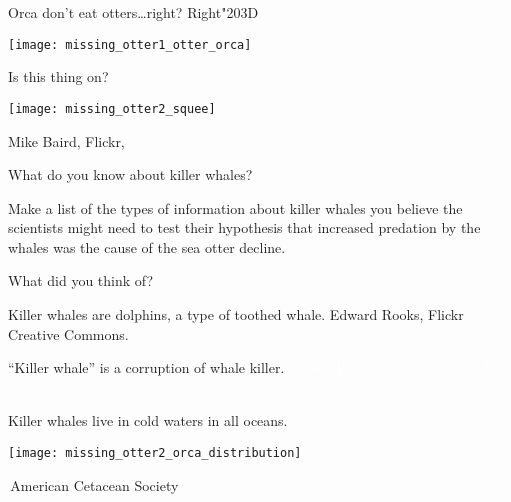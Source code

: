 \documentclass[t]{beamer}
\begin{document}

%
\begin{frame}[t]{Orca don't eat otters\dots right? \hfill Right\char"203D}

	\texttt{[image: missing\_otter1\_otter\_orca]}

	\vfilll
	
	\hfill \tiny Is this thing on?
\end{frame}
%
{
\begin{frame}
\texttt{[image: missing\_otter2\_squee]}

\vfilll

\hfill \tiny Mike Baird, Flickr, 
\end{frame}
}
%
\begin{frame}[t]{What do you know about killer whales?}

	\hangpara Make a list of the types of information about killer whales you believe the scientists might need to test their hypothesis that increased predation by the whales was the cause of the sea otter decline.

	\pause

	\hangpara What did you think of?

\end{frame}
%
{
\begin{frame}[b]{Killer whales are dolphins, a type of toothed whale.}
	\hfill \tiny Edward Rooks, Flickr Creative Commons.
\end{frame}
}
%
{
\begin{frame}[b]{``Killer whale'' is a corruption of whale killer.}
	\hfill \tiny \textcolor{white}{Robert Pittman, \textsc{noaa}, Wikimedia, public domain.}
\end{frame}
}
%

\begin{frame}[t]{Killer whales live in cold waters in all oceans.}

	\texttt{[image: missing\_otter2\_orca\_distribution]}
	
	\vfilll
	
	\hfill \tiny \textcopyright\,American Cetacean Society
\end{frame}
\end{document}
